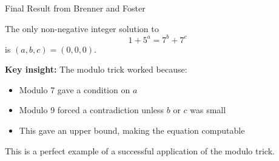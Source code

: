 \begin{frame}{Final Result from Brenner and Foster}
    \begin{theoremss}
        The only non-negative integer solution to
        \[1 + 5^a = 7^b + 7^c\]
        is $(a,b,c) = (0,0,0)$.
    \end{theoremss}
    
    \vspace{0.3cm}
    \textbf{Key insight:} The modulo trick worked because:
    \begin{itemize}
        \item Modulo 7 gave a condition on $a$
        \item Modulo 9 forced a contradiction unless $b$ or $c$ was small
        \item This gave an upper bound, making the equation computable
    \end{itemize}
    
    This is a perfect example of a successful application of the modulo trick.
\end{frame}

